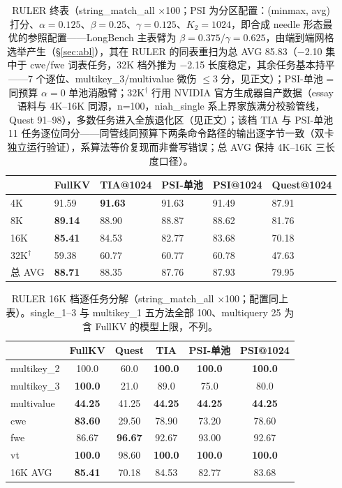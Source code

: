 \documentclass[11pt]{article}
\begin{document}
\begin{table}[h]\centering
\caption{RULER 终表（string\_match\_all $\times$100；PSI 为分区配置：(minmax, avg) 打分、$\alpha{=}0.125$、$\beta{=}0.25$、$\gamma{=}0.125$、$K_2{=}1024$，即合成 needle 形态最优的参照配置——LongBench 主表臂为 $\beta{=}0.375/\gamma{=}0.625$，由端到端网格选举产生（\S\ref{sec:abl}），其在 RULER 的同表重扫为总 AVG 85.83（$-$2.10 集中于 cwe/fwe 词表任务，32K 档外推为 $-$2.15 长度稳定，其余任务基本持平——7 个逐位、multikey\_3/multivalue 微伤 $\leq$3 分，见正文）；PSI-单池 = 同预算 $\alpha{=}0$ 单池消融臂；32K$^\dagger$ 行用 NVIDIA 官方生成器自产数据（essay 语料与 4K--16K 同源，n=100，niah\_single 系上界家族满分校验管线，Quest 91--98），多数任务进入全族退化区（见正文）；该档 TIA 与 PSI-单池 11 任务逐位同分——同管线同预算下两条命令路径的输出逐字节一致（双卡独立运行验证），系算法等价复现而非誊写错误；总 AVG 保持 4K--16K 三长度口径）。}
\begin{tabular}{llllll}
\toprule
 & FullKV & TIA@1024 & PSI-单池 & PSI@1024 & Quest@1024 \\
\midrule
4K & 91.59 & \textbf{91.63} & 91.63 & 91.49 & 87.91 \\
8K & \textbf{89.14} & 88.90 & 88.87 & 88.62 & 81.76 \\
16K & \textbf{85.41} & 84.53 & 82.77 & 83.68 & 70.18 \\
32K$^\dagger$ & 59.38 & 60.77 & 60.77 & 60.78 & 47.63 \\
\addlinespace
总 AVG & \textbf{88.71} & 88.35 & 87.76 & 87.93 & 79.95 \\
\bottomrule
\end{tabular}
\label{tab:ruler}
\end{table}

\begin{table}[h]\centering
\small\setlength{\tabcolsep}{4pt}
\caption{RULER 16K 档逐任务分解（string\_match\_all $\times$100；配置同上表）。single\_1--3 与 multikey\_1 五方法全部 100、multiquery 25 为含 FullKV 的模型上限，不列。}
\label{tab:ruler16k}
\begin{tabular}{lccccc}
\toprule
 & FullKV & Quest & TIA & PSI-单池 & PSI@1024 \\
\midrule
multikey\_2 & 100.0 & 60.0 & \textbf{100.0} & \textbf{100.0} & \textbf{100.0} \\
multikey\_3 & \textbf{100.0} & 21.0 & 89.0 & 75.0 & 80.0 \\
multivalue & \textbf{44.25} & 41.25 & \textbf{44.25} & \textbf{44.25} & \textbf{44.25} \\
cwe & \textbf{83.60} & 29.50 & 78.90 & 73.20 & 78.60 \\
fwe & 86.67 & \textbf{96.67} & 92.67 & 93.00 & 92.67 \\
vt & \textbf{100.0} & 98.60 & \textbf{100.0} & \textbf{100.0} & \textbf{100.0} \\
16K AVG & \textbf{85.41} & 70.18 & 84.53 & 82.77 & 83.68 \\
\bottomrule
\end{tabular}
\end{table}
\end{document}
